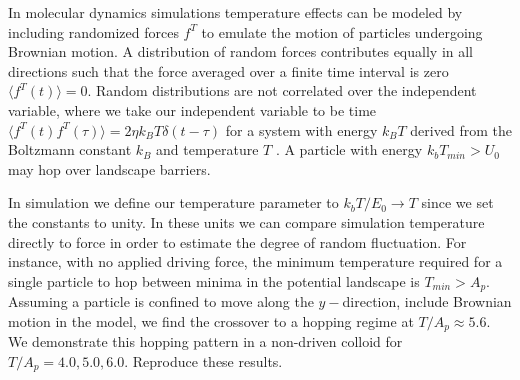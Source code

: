 \documentclass[twocolumn,preprintnumbers,amsmath,amssymb,aps,prx]{revtex4}
\begin{document}
  In molecular dynamics simulations temperature effects
  can be modeled by including randomized forces $f^T$
  to emulate the motion of particles undergoing Brownian motion.
  A distribution of random forces contributes equally in all
  directions such that the force averaged over a finite time interval
  is zero $\langle f^T(t) \rangle = 0$.
  Random distributions are not correlated 
  over the independent variable,
  where we take our independent variable to be time 
  $\langle f^T(t) f^T(\tau)\rangle = 2 \eta k_B T \delta(t-\tau)$
  for a system with 
  energy $k_B T$
  derived from the Boltzmann constant $k_B$
  and temperature $T$ \cite{Allen2017}.
  A particle
  with energy $k_b T_{min} > U_0$ may 
  hop over landscape
  barriers.

  In simulation we define our temperature parameter to
  $k_b T/E_0 \rightarrow T$
  since we set the constants to unity.
  In these units we can compare 
  simulation temperature directly
  to force 
  in order to estimate the degree of random fluctuation.
  For instance, 
  with
  no applied driving force,
  the minimum temperature required for a single particle
  to hop between minima in the potential landscape is
  $T_{min} > A_p$.
  Assuming a particle is confined to
  move along the $y-$direction,
  include Brownian motion 
  in the model,
  we find the crossover
  to a hopping regime at $T/A_p \approx 5.6$.
  We demonstrate this hopping
  pattern in 
  a non-driven colloid for $T/A_p = 4.0, 5.0, 6.0$.
  Reproduce these results.
  
\end{document}
